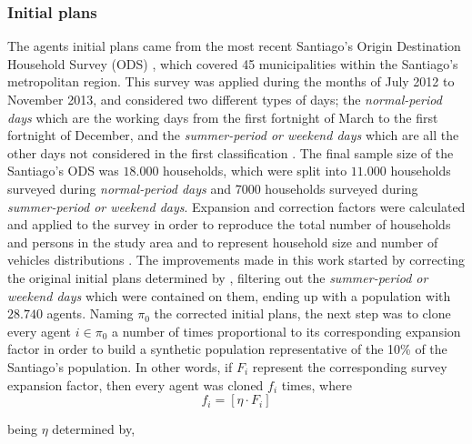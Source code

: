 \documentclass[Journal,letterpaper]{ascelike-new}
\begin{document}
\subsubsection{Initial plans}
The agents initial plans came from the most recent Santiago's Origin Destination Household Survey (ODS) \citep{EOD2012}, which covered 45 municipalities within the Santiago's metropolitan region. This survey was applied during the months of July 2012 to November 2013, and considered two different types of days; the \emph{normal-period days} which are the working days from the first fortnight of March to the first fortnight of December, and the \emph{summer-period or weekend days} which are all the other days not considered in the first classification \citep{munoz2016encuesta}. The final sample size of the Santiago's ODS was $18.000$ households, which were split into $11.000$ households surveyed during \emph{normal-period days} and 7000 households surveyed during \emph{summer-period or weekend days}. Expansion and correction factors were calculated and applied to the survey in order to reproduce the total number of households and persons in the study area and to represent household size and number of vehicles distributions \citep{Contreras2015}. 
The improvements made in this work started by correcting the original initial plans determined by \cite{KickhoeferEtAl2016}, filtering out the \emph{summer-period or weekend days} which were contained on them, ending up with a population with $28.740$ agents. Naming $\pi_{0}$ the corrected initial plans, the next step was to clone every agent $i \in \pi_{0}$ a number of times proportional to its corresponding expansion factor in order to build a synthetic population representative of the 10\% of the Santiago's population. In other words, if $F_{i}$ represent the corresponding survey expansion factor, then every agent was cloned $f_{i}$ times, where
\begin{equation}
    f_{\mathit{i}}= [\eta\cdot F_{\mathit{i}}]
\end{equation}

being $\eta$ determined by,
\end{document}
